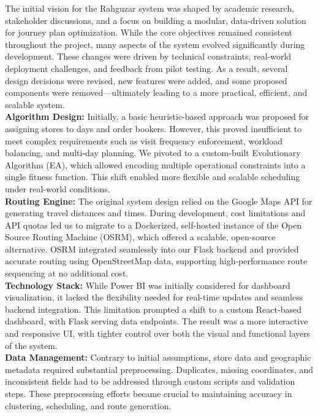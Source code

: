 The initial vision for the Rahguzar system was shaped by academic research, stakeholder discussions, and a focus on building a modular, data-driven solution for journey plan optimization. While the core objectives remained consistent throughout the project, many aspects of the system evolved significantly during development. These changes were driven by technical constraints, real-world deployment challenges, and feedback from pilot testing. As a result, several design decisions were revised, new features were added, and some proposed components were removed—ultimately leading to a more practical, efficient, and scalable system.
\\
\textbf{Algorithm Design:} Initially, a basic heuristic-based approach was proposed for assigning stores to days and order bookers. However, this proved insufficient to meet complex requirements such as visit frequency enforcement, workload balancing, and multi-day planning. We pivoted to a custom-built Evolutionary Algorithm (EA), which allowed encoding multiple operational constraints into a single fitness function. This shift enabled more flexible and scalable scheduling under real-world conditions.
\\
\textbf{Routing Engine:} The original system design relied on the Google Maps API for generating travel distances and times. During development, cost limitations and API quotas led us to migrate to a Dockerized, self-hosted instance of the Open Source Routing Machine (OSRM), which offered a scalable, open-source alternative. OSRM integrated seamlessly into our Flask backend and provided accurate routing using OpenStreetMap data, supporting high-performance route sequencing at no additional cost.
\\
\textbf{Technology Stack:} While Power BI was initially considered for dashboard visualization, it lacked the flexibility needed for real-time updates and seamless backend integration. This limitation prompted a shift to a custom React-based dashboard, with Flask serving data endpoints. The result was a more interactive and responsive UI, with tighter control over both the visual and functional layers of the system.
\\
\textbf{Data Management:} Contrary to initial assumptions, store data and geographic metadata required substantial preprocessing. Duplicates, missing coordinates, and inconsistent fields had to be addressed through custom scripts and validation steps. These preprocessing efforts became crucial to maintaining accuracy in clustering, scheduling, and route generation.
